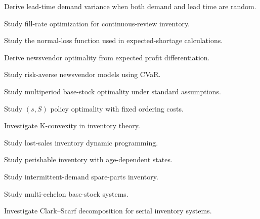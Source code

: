 \begin{exercise}[4]
Derive lead-time demand variance when both demand and lead time are random.
\end{exercise}

\begin{exercise}[4]
Study fill-rate optimization for continuous-review inventory.
\end{exercise}

\begin{exercise}[4]
Study the normal-loss function used in expected-shortage calculations.
\end{exercise}

\begin{exercise}[4]
Derive newsvendor optimality from expected profit differentiation.
\end{exercise}

\begin{exercise}[4]
Study risk-averse newsvendor models using CVaR.
\end{exercise}

\begin{exercise}[4]
Study multiperiod base-stock optimality under standard assumptions.
\end{exercise}

\begin{exercise}[4]
Study \((s,S)\) policy optimality with fixed ordering costs.
\end{exercise}

\begin{exercise}[4]
Investigate K-convexity in inventory theory.
\end{exercise}

\begin{exercise}[4]
Study lost-sales inventory dynamic programming.
\end{exercise}

\begin{exercise}[4]
Study perishable inventory with age-dependent states.
\end{exercise}

\begin{exercise}[4]
Study intermittent-demand spare-parts inventory.
\end{exercise}

\begin{exercise}[4]
Study multi-echelon base-stock systems.
\end{exercise}

\begin{exercise}[4]
Investigate Clark--Scarf decomposition for serial inventory systems.
\end{exercise}

